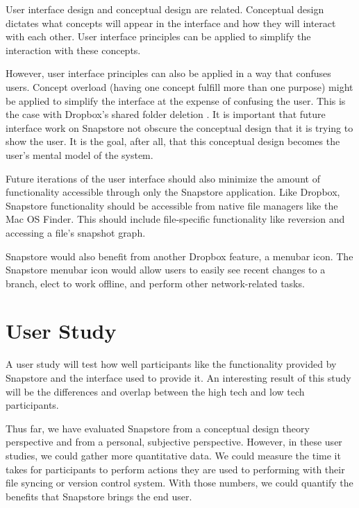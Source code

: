 User interface design and conceptual design are related. Conceptual design dictates what concepts will appear in the interface and how they will interact with each other. User interface principles can be applied to simplify the interaction with these concepts. 

However, user interface principles can also be applied in a way that confuses users. Concept overload (having one concept fulfill more than one purpose) might be applied to simplify the interface at the expense of confusing the user. This is the case with Dropbox's shared folder deletion \cite{Zhang}. It is important that future interface work on Snapstore not obscure the conceptual design that it is trying to show the user. It is the goal, after all, that this conceptual design becomes the user's mental model of the system.

Future iterations of the user interface should also minimize the amount of functionality accessible through only the Snapstore application. Like Dropbox, Snapstore functionality should be accessible from native file managers like the Mac OS Finder. This should include file-specific functionality like reversion and accessing a file's snapshot graph.

Snapstore would also benefit from another Dropbox feature, a menubar icon. The Snapstore menubar icon would allow users to easily see recent changes to a branch, elect to work offline, and perform other network-related tasks.

\section{User Study}

A user study will test how well participants like the functionality provided by Snapstore and the interface used to provide it. An interesting result of this study will be the differences and overlap between the high tech and low tech participants.

Thus far, we have evaluated Snapstore from a conceptual design theory perspective and from a personal, subjective perspective. However, in these user studies, we could gather more quantitative data. We could measure the time it takes for participants to perform actions they are used to performing with their file syncing or version control system. With those numbers, we could quantify the benefits that Snapstore brings the end user.





